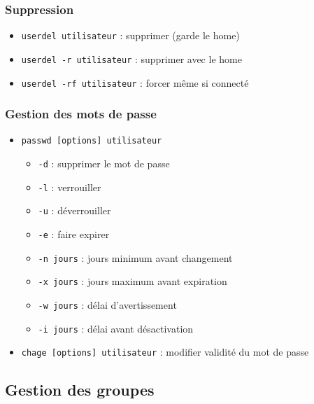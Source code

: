 \documentclass[12pt,a4paper]{article}
\begin{document}
\subsubsection{Suppression}
\begin{itemize}
    \item \texttt{userdel utilisateur} : supprimer (garde le home)
    \item \texttt{userdel -r utilisateur} : supprimer avec le home
    \item \texttt{userdel -rf utilisateur} : forcer m\^eme si connect\'e
\end{itemize}

\subsubsection{Gestion des mots de passe}
\begin{itemize}
    \item \texttt{passwd [options] utilisateur}
    \begin{itemize}
        \item \texttt{-d} : supprimer le mot de passe
        \item \texttt{-l} : verrouiller
        \item \texttt{-u} : d\'everrouiller
        \item \texttt{-e} : faire expirer
        \item \texttt{-n jours} : jours minimum avant changement
        \item \texttt{-x jours} : jours maximum avant expiration
        \item \texttt{-w jours} : d\'elai d'avertissement
        \item \texttt{-i jours} : d\'elai avant d\'esactivation
    \end{itemize}
    \item \texttt{chage [options] utilisateur} : modifier validit\'e du mot de passe
\end{itemize}

\subsection{Gestion des groupes}
\end{document}

